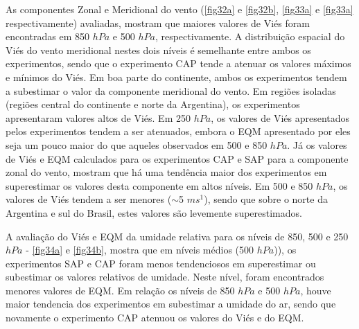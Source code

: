 As componentes Zonal e Meridional do vento (\autoref{fig32a} e \autoref{fig32b}, \autoref{fig33a} e \autoref{fig33a} respectivamente) avaliadas, mostram que maiores valores de Viés foram encontradas em 850 $hPa$ e 500 $hPa$, respectivamente. A distribuição espacial do Viés do vento meridional nestes dois níveis é semelhante entre ambos os experimentos, sendo que o experimento CAP tende a atenuar os valores máximos e mínimos do Viés. Em boa parte do continente, ambos os experimentos tendem a subestimar o valor da componente meridional do vento. Em regiões isoladas (regiões central do continente e norte da Argentina), os experimentos apresentaram valores altos de Viés. Em 250 $hPa$, os valores de Viés apresentados pelos experimentos tendem a ser atenuados, embora o EQM apresentado por eles seja um pouco maior do que aqueles observados em 500 e 850 $hPa$. Já os valores de Viés e EQM calculados para os experimentos CAP e SAP para a componente zonal do vento, mostram que há uma tendência maior dos experimentos em superestimar os valores desta componente em altos níveis. Em 500 e 850 $hPa$, os valores de Viés tendem a ser menores ($\sim$5 $ms^{1}$), sendo que sobre o norte da Argentina e sul do Brasil, estes valores são levemente superestimados.



A avaliação do Viés e EQM da umidade relativa para os níveis de 850, 500 e 250 $hPa$ - \autoref{fig34a} e \autoref{fig34b}, mostra que em níveis médios (500 $hPa$)), os experimentos SAP e CAP foram menos tendenciosos em superestimar ou subestimar os valores relativos de umidade. Neste nível, foram encontrados menores valores de EQM. Em relação os níveis de 850 $hPa$ e 500 $hPa$, houve maior tendencia dos experimentos em subestimar a umidade do ar, sendo que novamente o experimento CAP atenuou os valores do Viés e do EQM.




